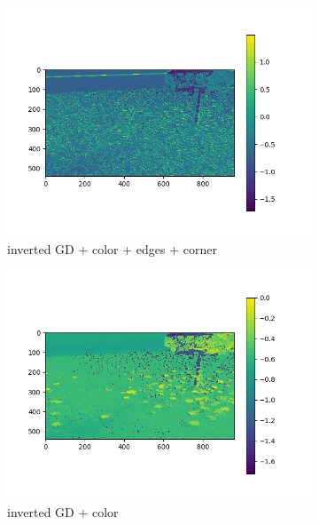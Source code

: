 \documentclass[fleqn,10pt]{SelfArx} %
\begin{document}
\begin{figure}
        \begin{subfigure}[b]{0.3\textwidth}
                \includegraphics[width=\linewidth]{Figures/Combi/res1.png}
                \caption{inverted GD + color + edges + corner}
                \label{fig:ResSum}
        \end{subfigure}
        \begin{subfigure}[b]{0.3\textwidth}
                \includegraphics[width=\linewidth]{Figures/Combi/res2.png}
                \caption{inverted GD + color}
                \label{fig:ResColor}
        \end{subfigure}
        \begin{subfigure}[b]{0.3\textwidth}

\end{subfigure}
\end{figure}
\end{document}
